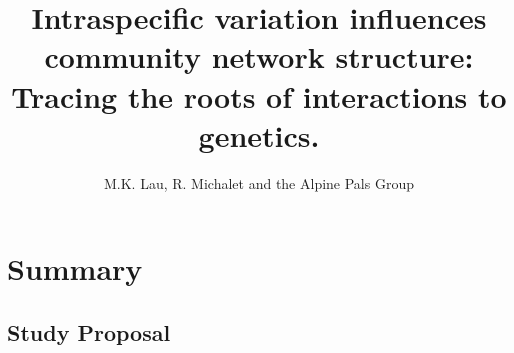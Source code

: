 \documentclass[12pt]{article}
\title{Intraspecific variation influences community network structure: Tracing the roots of interactions to genetics.}
\author{M.K. Lau, R. Michalet and the Alpine Pals Group}
\begin{document}
\maketitle




\section{Summary}



\subsection{Study Proposal}
\end{document}
